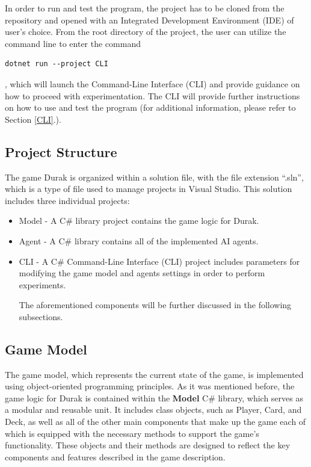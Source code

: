 In order to run and test the program, the project has to be cloned from the repository and opened with an Integrated Development Environment (IDE) of user's choice. From the root directory of the project, the user can utilize the command line to enter the command 
\begin{lstlisting}[frame=single]
dotnet run --project CLI
\end{lstlisting}
, which will launch the Command-Line Interface (CLI) and provide guidance on how to proceed with experimentation. The CLI will provide further instructions on how to use and test the program (for additional information, please refer to Section \ref{CLI}.).

\subsection{Project Structure}
The game Durak is organized within a solution file, with the file extension ``.sln'', which is a type of file used to manage projects in Visual Studio. This solution includes three individual projects: 

\begin{itemize}

\item Model - A C\# library project contains the game logic for Durak.

\item Agent - A C\# library contains all of the implemented AI agents.

\item CLI - A C\# Command-Line Interface (CLI) project includes parameters for modifying the game model and agents settings in order to perform experiments.

The aforementioned components will be further discussed in the following subsections.

\end{itemize}

\subsection{Game Model}

The game model, which represents the current state of the game, is implemented using object-oriented programming principles. As it was mentioned before, the game logic for Durak is contained within the \textbf{Model} C\# library, which serves as a modular and reusable unit. It includes class objects, such as Player, Card, and Deck, as well as all of the other main components that make up the game each of which is equipped with the necessary methods to support the game's functionality. These objects and their methods are designed to reflect the key components and features described in the game description.

